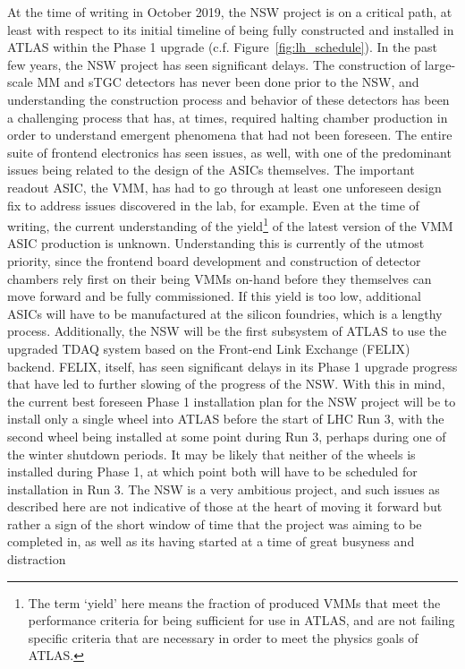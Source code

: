 At the time of writing in October 2019, the NSW project is on a critical path, at least with respect to its initial timeline of
being fully constructed and installed in ATLAS within the Phase 1 upgrade (c.f. Figure~\ref{fig:lh_schedule}).
In the past few years, the NSW project has seen significant delays.
The construction of large-scale MM and sTGC detectors has never been done prior to the NSW, and
understanding the construction process and behavior of these detectors has been a challenging process
that has, at times, required halting chamber production in order to understand emergent phenomena
that had not been foreseen.
The entire suite of frontend electronics has seen issues, as well, with one of the predominant issues being related to the
design of the ASICs themselves.
The important readout ASIC, the VMM, has had to go through at least one unforeseen design fix to address
issues discovered in the lab, for example.
Even at the time of writing, the current understanding of the yield\footnote{The term `yield' here means
the fraction of produced VMMs that meet the performance criteria for being sufficient for use in ATLAS, and are not
failing specific criteria that are necessary in order to meet the physics goals of ATLAS.}
of the latest version of the VMM ASIC production is unknown.
Understanding this is currently of the utmost priority, since the frontend board development and construction of
detector chambers rely first on their being VMMs on-hand before they themselves can move forward and be fully commissioned.
If this yield is too low, additional ASICs will have to be manufactured at the silicon foundries, which is a lengthy process.
Additionally, the NSW will be the first subsystem of ATLAS to use the upgraded TDAQ system based
on the Front-end Link Exchange (FELIX)~\cite{FELIX} backend.
FELIX, itself, has seen significant delays in its Phase 1 upgrade progress that have led to 
further slowing of the progress of the NSW.
With this in mind, the current best foreseen Phase 1 installation plan for the NSW project will be to install only a single wheel
into ATLAS before the start of LHC Run 3, with the second wheel being installed at some point
during Run 3, perhaps during one of the winter shutdown periods.
It may be likely that neither of the wheels is installed during Phase 1, at which point both will have to be scheduled
for installation in Run 3.
The NSW is a very ambitious project, and such issues as described here are not indicative of those
at the heart of moving it forward but rather a sign of the short window of time that the project
was aiming to be completed in, as well as its having started at a time of great busyness and distraction
